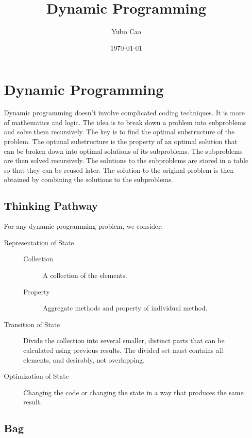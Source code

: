 \documentclass{article}
\title{Dynamic Programming}
\author{Yubo Cao}
\date{\today}
\begin{document}
\maketitle
\tableofcontents
\newpage

\section{Dynamic Programming}

Dynamic programming doesn't involve complicated coding techniques. It is more of mathematics and logic. The idea is to break down a problem into subproblems and solve them recursively. The key is to find the optimal substructure of the problem. The optimal substructure is the property of an optimal solution that can be broken down into optimal solutions of its subproblems. The subproblems are then solved recursively. The solutions to the subproblems are stored in a table so that they can be reused later. The solution to the original problem is then obtained by combining the solutions to the subproblems.

\subsection{Thinking Pathway}

For any dynamic programming problem, we consider:

\begin{description}
	\item[Representation of State]
		\begin{description}
			\item[Collection] A collection of the elements.
			\item[Property] Aggregate methods and property of individual method.
		\end{description}
	\item[Transition of State] Divide the collection into several smaller, distinct parts that can be calculated using previous results. The divided set must contains all elements, and desirably, not overlapping.
	\item[Optimization of State] Changing the code or changing the state in a way that produces the same result.
\end{description}

\subsection{Bag}
\end{document}
